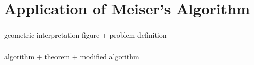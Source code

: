\section{Application of Meiser's Algorithm}
\begin{frame}\frametitle{\insertsection}\justifying
geometric interpretation figure + problem definition
\end{frame}
\begin{frame}\frametitle{\insertsection}\justifying
algorithm + theorem + modified algorithm
\end{frame}
